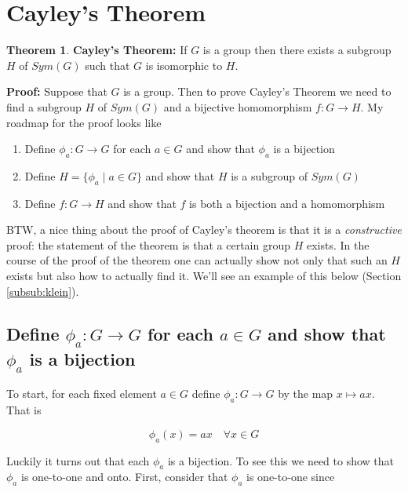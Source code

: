 \documentclass{article}
\theoremstyle{definition}
\newtheorem{theorem}{Theorem}[section]
\begin{document}
\section{Cayley's Theorem}

\begin{theorem}
\textbf{Cayley's Theorem: }If $G$ is a group then there exists a
subgroup $H$ of $Sym(G)$ such that $G$ is isomorphic to $H$. 
\label{thm:caley}
\end{theorem}

\noindent
\textbf{Proof:} Suppose that $G$ is a group.  Then to prove
Cayley's Theorem we need to find a subgroup $H$ of $Sym(G)$ and a
bijective homomorphism $f: G \rightarrow H$. My roadmap for the
proof looks like

\bigskip
\begin{enumerate}
\item Define $\phi_{a}: G \rightarrow G$ for each $a \in G$ and
show that $\phi_{a}$ is a bijection
\item Define $H = \{\phi_{a} \mid a \in G\}$ and show that $H$ is
a subgroup of $Sym(G)$
\item Define $f:G \rightarrow H$ and show that $f$ is both a
bijection and a homomorphism
\end{enumerate}

\bigskip
\noindent
BTW, a nice thing about the proof of Cayley's theorem is that it
is a \emph{constructive} proof: the statement of the theorem is
that a certain group $H$ exists.  In the course of the proof of
the theorem one can actually show not only that such an $H$
exists but also how to actually find it. We'll see an example of
this below (Section \ref{subsub:klein}).


\subsection{Define $\phi_{a}: G \rightarrow G$ for each $a \in G$
and show that $\phi_{a}$ is a bijection}
To start, for each fixed element $a \in G$ define $\phi_{a}: G
\rightarrow G$ by the map $x \mapsto ax$. That is

\begin{equation}
\phi_{a}(x) = ax \quad \forall x \in G
\label{eqn:phi}
\end{equation}


\bigskip
\noindent
Luckily it turns out that each $\phi_{a}$ is a bijection.  To see
this we need to show that $\phi_a$ is one-to-one and onto.
First, consider that $\phi_a$ is one-to-one since
\end{document}
